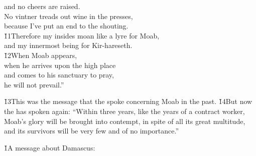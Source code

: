 \begin{poetry}
\poeml and no cheers are raised. \\
\poemll    No vintner treads out wine in the presses, \\
\poemlll       because I've put an end to the shouting. \\
\poeml \v{11}Therefore my insides moan like a lyre for Moab, \\
\poemll    and my innermost being for Kir-hareseth. \\
\poeml \v{12}When Moab appears, \\
\poemll    when he arrives upon the high place \\
\poeml and comes to his sanctuary to pray, \\
\poemll    he will not prevail.''
\end{poetry}

\v{13}This was the message that the  spoke concerning Moab in the past. \v{14}But now the  has spoken again: ``Within three years, like the years of a contract worker, Moab's glory will be brought into contempt, in spite of all its great multitude, and its survivors will be very few and of no importance.''

\v{1}A message about Damascus:

